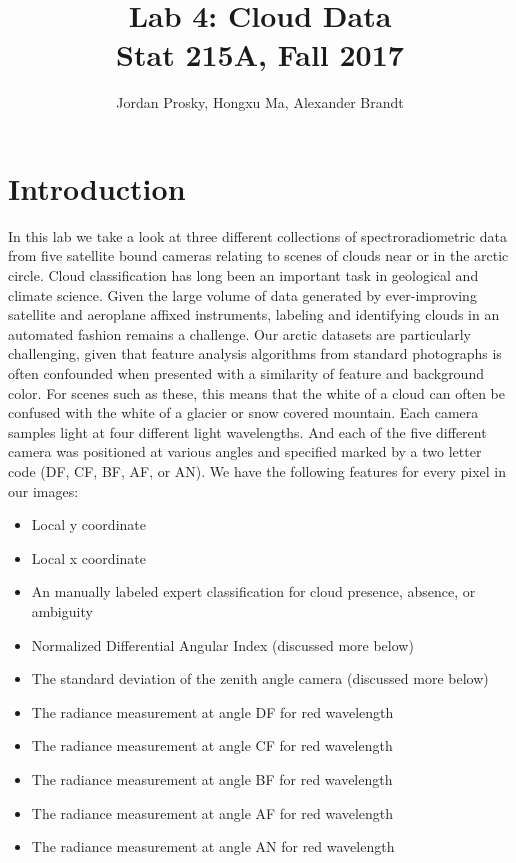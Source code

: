 \documentclass{article}\usepackage[]{graphicx}\usepackage[]{color}
\begin{document}
\title{Lab 4: Cloud Data \\ Stat 215A, Fall 2017}

\author{Jordan Prosky, Hongxu Ma, Alexander Brandt}

\maketitle 

\section*{Introduction}

In this lab we take a look at three different collections of spectroradiometric data from five satellite bound cameras relating to scenes of clouds near or in the arctic circle.  Cloud classification has long been an important task in geological and climate science.  Given the large volume of data generated by ever-improving satellite and aeroplane affixed instruments, labeling and identifying clouds in an automated fashion remains a challenge.  Our arctic datasets are particularly challenging, given that feature analysis algorithms from standard photographs is often confounded when presented with a similarity of feature and background color.  For scenes such as these, this means that the white of a cloud can often be confused with the white of a glacier or snow covered mountain.
Each camera samples light at four different light wavelengths.  And each of the five different camera was positioned at various angles and specified marked by a two letter code (DF, CF, BF, AF, or AN).  We have the following features for every pixel in our images:
\begin{itemize}
\item Local y coordinate
\item Local x coordinate
\item An manually labeled expert classification for cloud presence, absence, or ambiguity
\item Normalized Differential Angular Index (discussed more below)
\item The standard deviation of the zenith angle camera (discussed more below)
\item The radiance measurement at angle DF for red wavelength
\item The radiance measurement at angle CF for red wavelength
\item The radiance measurement at angle BF for red wavelength
\item The radiance measurement at angle AF for red wavelength
\item The radiance measurement at angle AN for red wavelength
\end{itemize}
\end{document}
